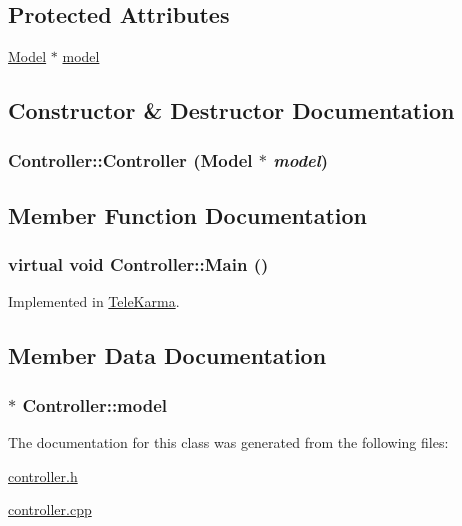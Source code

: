 \subsection*{Protected Attributes}
\begin{CompactItemize}
\item 
\hyperlink{classModel}{Model} $\ast$ \hyperlink{classController_6f6ea54052742d3940adfcfce885bae9}{model}
\end{CompactItemize}


\subsection{Constructor \& Destructor Documentation}
\hypertarget{classController_a3ca66cfc1e32af3f9b7563acf494277}{
\subsubsection[{Controller}]{\setlength{\rightskip}{0pt plus 5cm}Controller::Controller ({\bf Model} $\ast$ {\em model})}}
\label{classController_a3ca66cfc1e32af3f9b7563acf494277}




\subsection{Member Function Documentation}
\hypertarget{classController_efeb521047c5b5d1c3f97290d015cacf}{
\subsubsection[{Main}]{\setlength{\rightskip}{0pt plus 5cm}virtual void Controller::Main ()}}
\label{classController_efeb521047c5b5d1c3f97290d015cacf}




Implemented in \hyperlink{classTeleKarma_addd554bf6335422cc896c894005a031}{TeleKarma}.

\subsection{Member Data Documentation}
\hypertarget{classController_6f6ea54052742d3940adfcfce885bae9}{
\subsubsection[{model}]{$\ast$ {\bf Controller::model}}}
\label{classController_6f6ea54052742d3940adfcfce885bae9}




The documentation for this class was generated from the following files:\begin{CompactItemize}
\item 
\hyperlink{controller_8h}{controller.h}\item 
\hyperlink{controller_8cpp}{controller.cpp}\end{CompactItemize}
